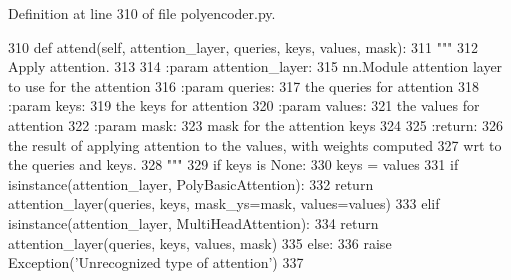Definition at line 310 of file polyencoder.\+py.


\begin{DoxyCode}
310     \textcolor{keyword}{def }attend(self, attention\_layer, queries, keys, values, mask):
311         \textcolor{stringliteral}{"""}
312 \textcolor{stringliteral}{        Apply attention.}
313 \textcolor{stringliteral}{}
314 \textcolor{stringliteral}{        :param attention\_layer:}
315 \textcolor{stringliteral}{            nn.Module attention layer to use for the attention}
316 \textcolor{stringliteral}{        :param queries:}
317 \textcolor{stringliteral}{            the queries for attention}
318 \textcolor{stringliteral}{        :param keys:}
319 \textcolor{stringliteral}{            the keys for attention}
320 \textcolor{stringliteral}{        :param values:}
321 \textcolor{stringliteral}{            the values for attention}
322 \textcolor{stringliteral}{        :param mask:}
323 \textcolor{stringliteral}{            mask for the attention keys}
324 \textcolor{stringliteral}{}
325 \textcolor{stringliteral}{        :return:}
326 \textcolor{stringliteral}{            the result of applying attention to the values, with weights computed}
327 \textcolor{stringliteral}{            wrt to the queries and keys.}
328 \textcolor{stringliteral}{        """}
329         \textcolor{keywordflow}{if} keys \textcolor{keywordflow}{is} \textcolor{keywordtype}{None}:
330             keys = values
331         \textcolor{keywordflow}{if} isinstance(attention\_layer, PolyBasicAttention):
332             \textcolor{keywordflow}{return} attention\_layer(queries, keys, mask\_ys=mask, values=values)
333         \textcolor{keywordflow}{elif} isinstance(attention\_layer, MultiHeadAttention):
334             \textcolor{keywordflow}{return} attention\_layer(queries, keys, values, mask)
335         \textcolor{keywordflow}{else}:
336             \textcolor{keywordflow}{raise} Exception(\textcolor{stringliteral}{'Unrecognized type of attention'})
337 
\end{DoxyCode}
\mbox{\label{classparlai_1_1agents_1_1transformer_1_1polyencoder_1_1PolyEncoderModule_a54ca3cb24e2a0fbbfa7b3f145c7558ed}} 
